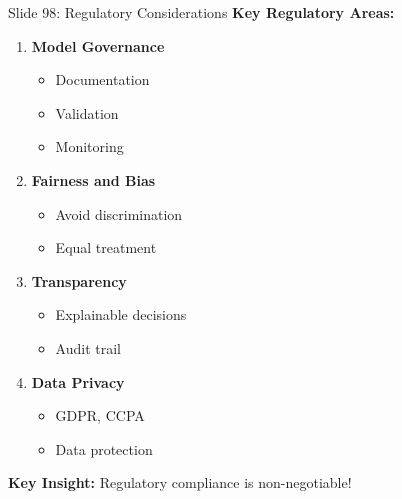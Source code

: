 \documentclass[8pt]{beamer}
\begin{document}
	\begin{frame}{Slide 98: Regulatory Considerations}
		\fontsize{6.5}{7.5}\selectfont
		\textbf{Key Regulatory Areas:}
		\begin{enumerate}
			\item \textbf{Model Governance}
			\begin{itemize}
				\item Documentation
				\item Validation
				\item Monitoring
			\end{itemize}
			\item \textbf{Fairness and Bias}
			\begin{itemize}
				\item Avoid discrimination
				\item Equal treatment
			\end{itemize}
			\item \textbf{Transparency}
			\begin{itemize}
				\item Explainable decisions
				\item Audit trail
			\end{itemize}
			\item \textbf{Data Privacy}
			\begin{itemize}
				\item GDPR, CCPA
				\item Data protection
			\end{itemize}
		\end{enumerate}
		
		\textcolor{myblue}{\textbf{Key Insight:}} Regulatory compliance is non-negotiable!
	\end{frame}
	
\end{document}
